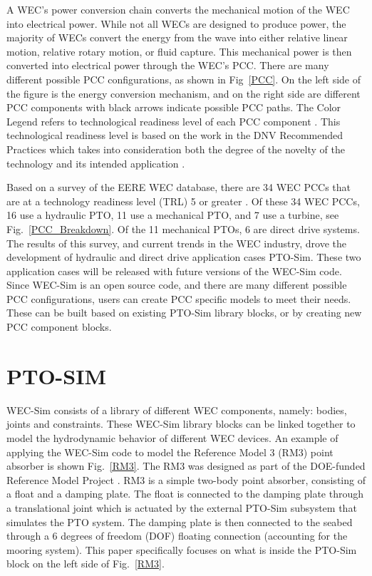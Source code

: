 \documentclass[twocolumn,10pt]{asme2e}
\begin{document}

A WEC's power conversion chain converts the mechanical motion of the WEC into electrical power. While not all WECs are designed to produce power, the majority of WECs convert the energy from the wave into either relative linear motion, relative rotary motion, or fluid capture. This mechanical power is then converted into electrical power through the WEC's PCC. There are many different possible PCC configurations, as shown in Fig~\ref{PCC}. On the left side of the figure is the energy conversion mechanism, and on the right side are different PCC components with black arrows indicate possible PCC paths. The Color Legend refers to technological readiness level of each PCC component \cite{reed2010accelerating}\cite{ruehl2012wave}. This technological readiness level is based on the work in the DNV Recommended Practices which takes into consideration both the degree of the novelty of the technology and its intended application \cite{veritas2001recommended}. 

Based on a survey of the EERE WEC database, there are 34 WEC PCCs that are at a technology readiness level (TRL) 5 or greater \cite{eere}. Of these 34 WEC PCCs, 16 use a hydraulic PTO, 11 use a mechanical PTO, and 7 use a turbine, see Fig.~\ref{PCC_Breakdown}. Of the 11 mechanical PTOs, 6 are direct drive systems. The results of this survey, and current trends in the WEC industry, drove the development of hydraulic and direct drive application cases PTO-Sim. These two application cases will be released with future versions of the WEC-Sim code. Since WEC-Sim is an open source code, and there are many different possible PCC configurations, users can create PCC specific models to meet their needs. These can be built based on existing PTO-Sim library blocks, or by creating new PCC component blocks.


\section*{PTO-SIM}

WEC-Sim consists of a library of different WEC components, namely: bodies, joints and constraints. These WEC-Sim library blocks can be linked together to model the hydrodynamic behavior of different WEC devices. An example of applying the WEC-Sim code to model the Reference Model 3 (RM3) point absorber is shown Fig.~\ref{RM3}. The RM3 was designed as part of the DOE-funded Reference Model Project \cite{sandia}. RM3 is a simple two-body point absorber, consisting of a float and a damping plate. The float is connected to the damping plate through a translational joint which is actuated by the external PTO-Sim subsystem that simulates the PTO system. The damping plate is then connected to the seabed through a 6 degrees of freedom (DOF) floating connection (accounting for the mooring system). This paper specifically focuses on what is inside the PTO-Sim block on the left side of Fig.~\ref{RM3}.
\end{document}
